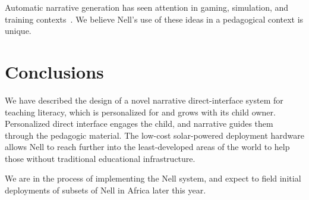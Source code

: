 \documentclass[preprint]{sig-alternate}
\begin{document}
Automatic narrative generation has seen attention in
gaming, simulation, and training contexts~\cite{riedl:2008}.
We believe
Nell's use of these ideas in a pedagogical context is unique.

\section{Conclusions}
We have described the design of a novel narrative direct-interface
system for teaching literacy, which is personalized for and grows with
its child owner.  Personalized direct interface engages the child, and
narrative guides them through the pedagogic material.  The low-cost
solar-powered deployment hardware allows Nell to reach further into the
least-developed areas of the world to help those without traditional
educational infrastructure.

We are in the process of implementing the Nell system, and expect to
field initial deployments of subsets of Nell in Africa later this year.



%

%
%
\balancecolumns
\end{document}
